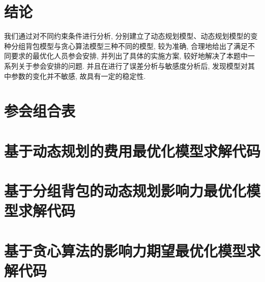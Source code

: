 \documentclass[a4paper,12pt]{ctexart}
\begin{document}
    \section{结论}

    我们通过对不同约束条件进行分析,
    分别建立了动态规划模型、动态规划模型的变种分组背包模型与贪心算法模型三种不同的模型,
    较为准确, 合理地给出了满足不同要求的最优化人员参会安排,
    并列出了具体的实施方案,
    较好地解决了本题中一系列关于参会安排的问题.
    并且在进行了误差分析与敏感度分析后,
    发现模型对其中参数的变化并不敏感, 故具有一定的稳定性.


    \newpage
    
    


    \newpage
    \appendix

    \section{参会组合表}

    

    \section{基于动态规划的费用最优化模型求解代码}

    

    \section{基于分组背包的动态规划影响力最优化模型求解代码}

    

    \section{基于贪心算法的影响力期望最优化模型求解代码}

    
\end{document}
